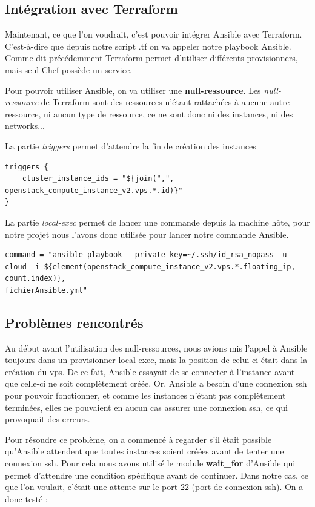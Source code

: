 \documentclass[]{article}
\begin{document}
\subsection{Intégration avec Terraform}\label{intuxe9gration-avec-terraform}

Maintenant, ce que l'on voudrait, c'est pouvoir intégrer Ansible avec Terraform.
C'est-à-dire que depuis notre script .tf on va appeler notre playbook Ansible. 
Comme dit précédemment Terraform permet d'utiliser différents provisionners, mais seul Chef possède un service. 

Pour pouvoir utiliser Ansible, on va utiliser une \textbf{null-ressource}. Les \textit{null-ressource} de Terraform sont des ressources n'étant rattachées à aucune autre ressource, ni aucun type de ressource, ce ne sont donc ni des instances, ni des networks...

La partie \textit{triggers} permet d'attendre la fin de création des instances
\begin{verbatim}
triggers { 
    cluster_instance_ids = "${join(",", openstack_compute_instance_v2.vps.*.id)}"
}
\end{verbatim}

La partie \textit{local-exec} permet de lancer une commande depuis la machine hôte, pour notre projet nous l'avons donc utilisée pour lancer notre commande Ansible.
\begin{verbatim}
command = "ansible-playbook --private-key=~/.ssh/id_rsa_nopass -u 
cloud -i ${element(openstack_compute_instance_v2.vps.*.floating_ip, count.index)},
fichierAnsible.yml"
\end{verbatim}


\subsection{Problèmes rencontrés}\label{probluxe8me-que-lon-a-eu}

Au début avant l'utilisation des null-ressources, nous avions mis l'appel à Ansible toujours dans un provisionner local-exec, mais la position de celui-ci était dans la création du vps. De ce fait, Ansible essayait de se connecter à l'instance avant que celle-ci ne soit complètement créée. Or, Ansible a besoin
d'une connexion ssh pour pouvoir fonctionner, et comme les instances
n'étant pas complètement terminées, elles ne pouvaient en aucun cas
assurer une connexion ssh, ce qui provoquait des erreurs.

Pour résoudre ce problème, on a commencé à regarder s'il était possible
qu'Ansible attendent que toutes instances soient créées avant de tenter
une connexion ssh. Pour cela nous avons utilisé le module
\textbf{wait\_for} d'Ansible qui permet d'attendre une condition
spécifique avant de continuer. Dans notre cas, ce que l'on voulait,
c'était une attente sur le port 22 (port de connexion ssh). On a donc
testé :
\end{document}
